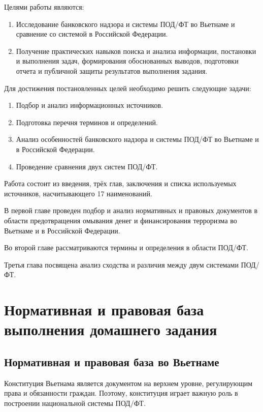 \documentclass{article}
\begin{document}
Целями работы являются:

\begin{enumerate}
    \item Исследование банковского надзора и системы ПОД/ФТ во Вьетнаме и сравнение со системой в Российской Федерации.
    \item Получение практических навыков поиска и анализа информации, постановки и выполнения задач, формирования обоснованных выводов, подготовки отчета и публичной защиты результатов выполнения задания.
\end{enumerate}

Для достижения постановленных целей необходимо решить следующие задачи:

\begin{enumerate}
    \item Подбор и анализ информационных источников.
    \item Подготовка перечня терминов и определений.
    \item Анализ особенностей банковского надзора и системы ПОД/ФТ во Вьетнаме и в Российской Федерации.
    \item Проведение сравнения двух систем ПОД/ФТ.
\end{enumerate}

Работа состоит из введения, трёх глав, заключения и списка используемых источников, насчитывающего 17 наименований.

В первой главе проведен подбор и анализ нормативных и правовых документов в области предотвращения омывания денег и финансирования терроризма во Вьетнаме и в Российской Федерации.

Во второй главе рассматриваются термины и определения в области ПОД/ФТ.

Третья глава посвящена анализ сходства и различия между двум системами ПОД/ФТ.

\newpage

\section{Нормативная и правовая база выполнения домашнего задания}

\hfill

\subsection{Нормативная и правовая база во Вьетнаме}

Конституция Вьетнама является документом на верхнем уровне, регулирующим права и обязанности граждан. Поэтому, конституция играет важную роль в построении национальной системы ПОД/ФТ.
\end{document}
